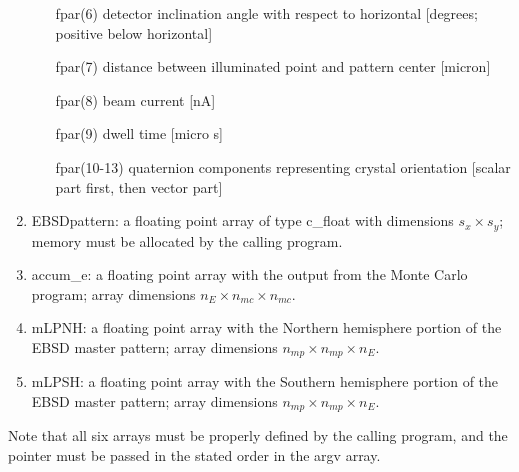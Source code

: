\documentclass[DIV=calc, paper=letter, fontsize=11pt]{scrartcl}	 %
\begin{document}
\begin{enumerate}
\begin{enumerate}
		\item[\textsf{fpar}(6)] detector inclination angle with respect to horizontal [degrees; positive below horizontal]
		\item[\textsf{fpar}(7)] distance between illuminated point and pattern center [micron]
		\item[\textsf{fpar}(8)] beam current [nA]
		\item[\textsf{fpar}(9)] dwell time [micro s]
		\item[\textsf{fpar}(10-13)] quaternion components representing crystal orientation [scalar part first, then vector part]
	\end{enumerate}
	\item \textsf{EBSDpattern}: a floating point array of type \textsf{c\_float} with dimensions $s_x\times s_y$; memory must be allocated by the calling program.
	\item \textsf{accum\_e}: a floating point array with the output from the Monte Carlo program; array dimensions $n_E\times n_{mc}\times n_{mc}$.
	\item \textsf{mLPNH}: a floating point array with the Northern hemisphere portion of the EBSD master pattern; array dimensions $n_{mp}\times n_{mp}\times n_E$.
	\item \textsf{mLPSH}: a floating point array with the Southern hemisphere portion of the EBSD master pattern; array dimensions $n_{mp}\times n_{mp}\times n_E$.
\end{enumerate}
Note that all six arrays must be properly defined by the calling program, and the pointer must be passed in the stated order in the \textsf{argv} array.

\newpage
\end{document}
